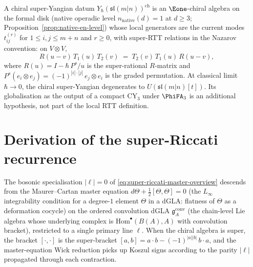 \begin{definition}
\label{def:chiral-super-yangian-mn}
A chiral super-Yangian datum
$Y_\hbar(\mathfrak{sl}(m|n))^{\mathrm{ch}}$ is an $\Eone$-chiral
algebra on the formal disk (native operadic level
$n_{\mathrm{native}}(d) = 1$ at $d \geq 3$;
Proposition~\ref{prop:native-en-level}) whose local generators are the current
modes $t^{(r)}_{ij}$ for $1 \le i, j \le m + n$ and $r \ge 0$, with
super-RTT relations in the Nazarov convention: on $V \otimes V$,
\[
R(u - v) \, T_1(u) \, T_2(v)
\;=\; T_2(v) \, T_1(u) \, R(u - v),
\]
where $R(u) = I - \hbar \, P^s / u$ is the super-rational $R$-matrix
and $P^s(e_i \otimes e_j) = (-1)^{|i| \cdot |j|} \, e_j \otimes e_i$ is
the graded permutation. At classical limit $\hbar \to 0$, the chiral
super-Yangian degenerates to $U(\mathfrak{sl}(m|n)[t])$. Its
globalisation as the output of a compact CY$_3$ under $\PhiFA_3$ is an
additional hypothesis, not part of the local RTT definition.
\end{definition}

\section{Derivation of the super-Riccati recurrence}
\label{sec:super-riccati-derivation}

The bosonic specialisation $|\ell| = 0$ of
\eqref{eq:super-riccati-master-overview} descends from the
Maurer--Cartan master equation
$d\Theta + \tfrac{1}{2}[\Theta, \Theta] = 0$ (the $L_\infty$
integrability condition for a degree-$1$ element $\Theta$ in a
dGLA: flatness of $\Theta$ as a deformation cocycle) on the ordered
convolution dGLA $\mathfrak{g}_A^{\mathrm{conv}}$ (the chain-level
Lie algebra whose underlying complex is
$\mathrm{Hom}^{\bullet}(B(A), A)$ with convolution bracket), restricted
to a single primary line $\ell$. When the chiral algebra is super,
the bracket $[\cdot, \cdot]$ is the super-bracket
$[a, b] = a \cdot b - (-1)^{|a| |b|} \, b \cdot a$, and the
master-equation Wick reduction picks up Koszul signs according to
the parity $|\ell|$ propagated through each contraction.

